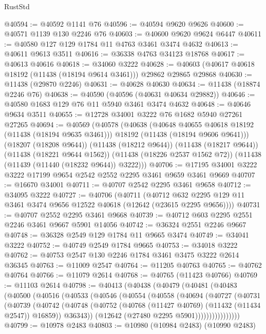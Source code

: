 \begin{lexlean}{RustStd}
\begin{coremodule}
@40594 := @40592 @1141 @76
@40596 := @40594 @9620 @9626
@40600 := @40571 @1139 @130 @2246 @76
@40603 := @40600 @9620 @9624 @6447
@40611 := @40580 @127 @129 @1784 @11 @4763 @3461 @3474 @4632
@40613 := @40611 @9613 @3511
@40616 := @36338 @4763 @34123 @18768
@40617 := @40613 @40616
@40618 := @34060 @3222
@40628 := @40603 (@40617 @40618 @18192 (@11438 (@18194 @9614 @3461))) @29862 @29865 @29868
@40630 := @11438 (@29870 @2246)
@40631 := @40628 @40630
@40634 := @11438 (@18874 @2246 @76)
@40638 := @40590 (@40596 (@40631 @40634 @29882))
@40646 := @40580 @1683 @129 @76 @11 @5940 @3461 @3474 @4632
@40648 := @40646 @9634 @3511
@40655 := @12728 @34001 @3222 @76 @1682 @5940 @27261 @27265
@40694 := @40569
    (@40578
      (@40638
        (@40648 @40655 @40618 @18192 (@11438 (@18194 @9635 @3461)))
        @18192
        (@11438 (@18194 @9606 @9641)))
      (@18207 (@18208 @9644))
      (@11438 (@18212 @9644))
      (@11438 (@18217 @9644))
      (@11438 (@18221 @9644 @1562))
      (@11438 (@18226 @2537 @1562 @72))
      (@11438 (@11439 (@11440 (@18232 @9644)) @3222)))
@40706 := @17195 @34001 @3222 @3222 @17199 @9654 @2542 @2552 @2295 @3461 @9659 @3461 @9669
@40707 := @16670 @34001
@40711 := @40707 @2542 @2295 @3461 @9658
@40712 := @34095 @3222
@40727 := @40706
    (@40711
      (@40712 @632 @2295 @129 @11 @3461 @3474 @9656 @12522 @40618 (@12642 (@23615 @2295 @9656))))
@40731 := @40707 @2552 @2295 @3461 @9668
@40739 := @40712 @603 @2295 @2551 @2246 @3461 @9667 @5901 @14056
@40742 := @36324 @2551 @2246 @9667
@40748 := @36328 @2549 @129 @1784 @11 @9665 @3474
@40749 := @34041 @3222
@40752 := @40749 @2549 @1784 @9665
@40753 := @34018 @3222
@40762 := @40753 @2547 @130 @2246 @1784 @3461 @3475 @3222 @2614 @36345
@40763 := @11009 @2547
@40764 := @11205 @40763
@40765 := @40762 @40764
@40766 := @11079 @2614
@40768 := @40765 (@11423 @40766)
@40769 := @11103 @2614
@40798 := @40413
    (@40438
      (@40479
        (@40481
          (@40483
            (@40500
              (@40516
                (@40533
                  (@40546
                    (@40554
                      (@40558
                        (@40694
                          (@40727
                            (@40731
                              (@40739
                                (@40742
                                  (@40748
                                    (@40752 (@40768 (@11427 @40769) (@11432 (@11434 @2547)) @16859))
                                    @36343))
                                (@12642 (@27480 @2295 @5901))))))))))))))))
@40799 := @10978 @2483
@40803 := @10980 (@10984 @2483) (@10990 @2483)

\end{coremodule}
\end{lexlean}
